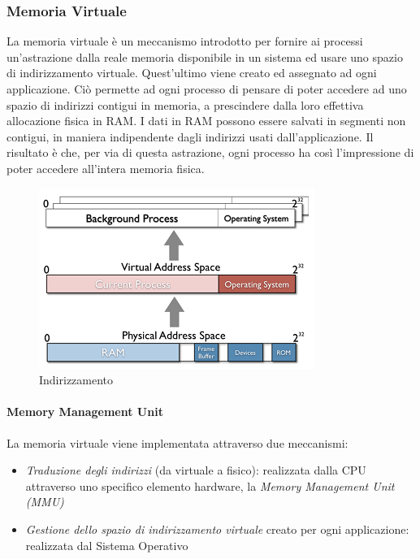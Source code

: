 \documentclass{article}
\begin{document}
\subsubsection{Memoria Virtuale}
La memoria virtuale è un meccanismo introdotto per fornire ai processi un’astrazione dalla reale memoria disponibile in un sistema ed usare uno spazio di indirizzamento virtuale.
Quest’ultimo viene creato ed assegnato ad ogni applicazione.
Ciò permette ad ogni processo di pensare di poter accedere ad uno spazio di indirizzi contigui in memoria, a prescindere dalla loro effettiva allocazione fisica in RAM.
I dati in RAM possono essere salvati in segmenti non contigui, in maniera indipendente dagli indirizzi usati dall’applicazione.
Il risultato è che, per via di questa astrazione, ogni processo ha così l’impressione di poter accedere all’intera memoria fisica.
\begin{figure}[H]
    \centering
    \includegraphics[scale=0.8]{img/Virt_tech/4.png}
    \caption{Indirizzamento}
\end{figure}\noindent

\paragraph{Memory Management Unit}
La memoria virtuale viene implementata attraverso due meccanismi:
\begin{itemize}
    \item\textit{Traduzione degli indirizzi} (da virtuale a fisico): realizzata dalla CPU attraverso uno specifico elemento hardware, la \textit{Memory Management Unit (MMU)}
    \item{\textit{Gestione dello spazio di indirizzamento virtuale} creato per ogni applicazione: realizzata dal Sistema Operativo}
\end{itemize}
\end{document}
